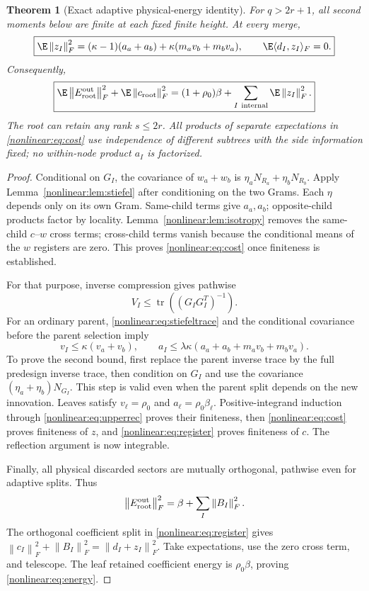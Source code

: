 \documentclass[11pt,oneside,openany,a4paper]{book}
\numberwithin{equation}{chapter}
\newtheorem{theorem}{Theorem}[chapter]
\theoremstyle{definition}
\theoremstyle{remark}
\newcommand{\F}[1]{\left\lVert#1\right\rVert_F}
\DeclareMathOperator{\tr}{tr}\DeclareMathOperator{\rank}{rank}
\begin{document}
\begin{theorem}[Exact adaptive physical-energy identity]\label{nonlinear:thm:adaptiveenergy}
For $q>2r+1$, all second moments below are finite at each fixed finite height. At every merge,
\begin{equation}\label{nonlinear:eq:cost}
 \boxed{\E\F{z_I}^2
   =(\kappa-1)(a_a+a_b)+\kappa(m_av_b+m_bv_a),\qquad
 \E\langle d_I,z_I\rangle_F=0.}
\end{equation}
Consequently,
\begin{equation}\label{nonlinear:eq:energy}
 \boxed{\E\F{E_{\rm root}^{\rm out}}^2+\E\F{c_{\rm root}}^2
  =(1+\rho_0)\beta+\sum_{I\ {\rm internal}}\E\F{z_I}^2.}
\end{equation}
The root can retain any rank $s\le2r$. All products of separate expectations in \eqref{nonlinear:eq:cost} use independence of different subtrees with the side information fixed; no within-node product $a_I$ is factorized.
\end{theorem}
\begin{proof}
Conditional on $G_I$, the covariance of $w_a+w_b$ is
$\eta_aN_{R_a}+\eta_bN_{R_b}$. Apply Lemma~\ref{nonlinear:lem:stiefel} after conditioning on the two Grams. Each $\eta$ depends only on its own Gram. Same-child terms give $a_a,a_b$; opposite-child products factor by locality. Lemma~\ref{nonlinear:lem:isotropy} removes the same-child $c$--$w$ cross terms; cross-child terms vanish because the conditional means of the $w$ registers are zero. This proves \eqref{nonlinear:eq:cost} once finiteness is established.

For that purpose, inverse compression gives pathwise
\[
 V_I\le\tr((G_IG_I^T)^{-1}).
\]
For an ordinary parent, \eqref{nonlinear:eq:stiefeltrace} and the conditional covariance before the parent selection imply
\begin{equation}\label{nonlinear:eq:upperrec}
 v_I\le\kappa(v_a+v_b),\qquad
 a_I\le\lambda\kappa(a_a+a_b+m_av_b+m_bv_a).
\end{equation}
To prove the second bound, first replace the parent inverse trace by the full predesign inverse trace, then condition on $G_I$ and use the covariance $(\eta_a+\eta_b)N_{G_I}$. This step is valid even when the parent split depends on the new innovation. Leaves satisfy $v_\ell=\rho_0$ and $a_\ell=\rho_0\beta_\ell$. Positive-integrand induction through \eqref{nonlinear:eq:upperrec} proves their finiteness, then \eqref{nonlinear:eq:cost} proves finiteness of $z$, and \eqref{nonlinear:eq:register} proves finiteness of $c$. The reflection argument is now integrable.

Finally, all physical discarded sectors are mutually orthogonal, pathwise even for adaptive splits. Thus
\[
 \F{E_{\rm root}^{\rm out}}^2=\beta+\sum_I\F{B_I}^2.
\]
The orthogonal coefficient split in \eqref{nonlinear:eq:register} gives
$\F{c_I}^2+\F{B_I}^2=\F{d_I+z_I}^2$. Take expectations, use the zero cross term, and telescope. The leaf retained coefficient energy is $\rho_0\beta$, proving \eqref{nonlinear:eq:energy}.
\end{proof}
\end{document}
